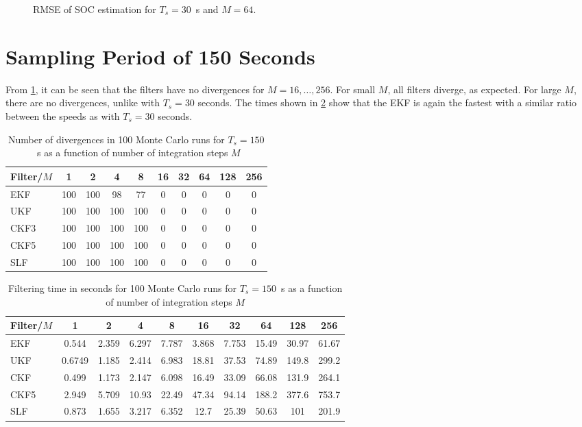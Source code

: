 \documentclass[../zhang_thesis.tex]{subfiles}
\begin{document}
\begin{figure}
\centering

\caption{RMSE of SOC estimation for $T_s=30$~s and $M=64$.}
\label{fig:rmse_30_64}
\end{figure}

\clearpage

\section{Sampling Period of 150 Seconds}

From \cref{tab:div_150}, it can be seen that the filters have no divergences for $M=16,\dots,256$. For small $M$, all filters diverge, as expected. For large $M$, there are no divergences, unlike with $T_s=30$ seconds. The times shown in \cref{tab:time_150} show that the EKF is again the fastest with a similar ratio between the speeds as with $T_s=30$ seconds. 

\begin{table}[h]
\centering
\caption{Number of divergences in 100 Monte Carlo runs for $T_s=150$~s as a function of number of integration steps $M$}
\begin{tabular}{@{}l*{9}{c}@{}}
\toprule
Filter/$M$ & 1   & 2   & 4   & 8   & 16 & 32 & 64 & 128 & 256 \\
\midrule
EKF        & 100 & 100 & 98  & 77  & 0  & 0  & 0  & 0   & 0   \\
UKF        & 100 & 100 & 100 & 100 & 0  & 0  & 0  & 0   & 0   \\
CKF3       & 100 & 100 & 100 & 100 & 0  & 0  & 0  & 0   & 0   \\
CKF5       & 100 & 100 & 100 & 100 & 0  & 0  & 0  & 0   & 0   \\
SLF        & 100 & 100 & 100 & 100 & 0  & 0  & 0  & 0   & 0   \\
\bottomrule
\end{tabular}
\label{tab:div_150}
\end{table}

\begin{table}[h]
\centering
\caption{Filtering time in seconds for 100 Monte Carlo runs for $T_s=150$~s as a function of number of integration steps $M$}
\begin{tabular}{@{}lccccccccc@{}}
\toprule
Filter/$M$ & 1      & 2     & 4     & 8     & 16    & 32    & 64    & 128   & 256   \\ \midrule
EKF        & 0.544  & 2.359 & 6.297 & 7.787 & 3.868 & 7.753 & 15.49 & 30.97 & 61.67 \\
UKF        & 0.6749 & 1.185 & 2.414 & 6.983 & 18.81 & 37.53 & 74.89 & 149.8 & 299.2 \\
CKF        & 0.499  & 1.173 & 2.147 & 6.098 & 16.49 & 33.09 & 66.08 & 131.9 & 264.1 \\
CKF5       & 2.949  & 5.709 & 10.93 & 22.49 & 47.34 & 94.14 & 188.2 & 377.6 & 753.7 \\
SLF        & 0.873  & 1.655 & 3.217 & 6.352 & 12.7  & 25.39 & 50.63 & 101   & 201.9 \\ \bottomrule
\end{tabular}
\label{tab:time_150}
\end{table}
\end{document}
